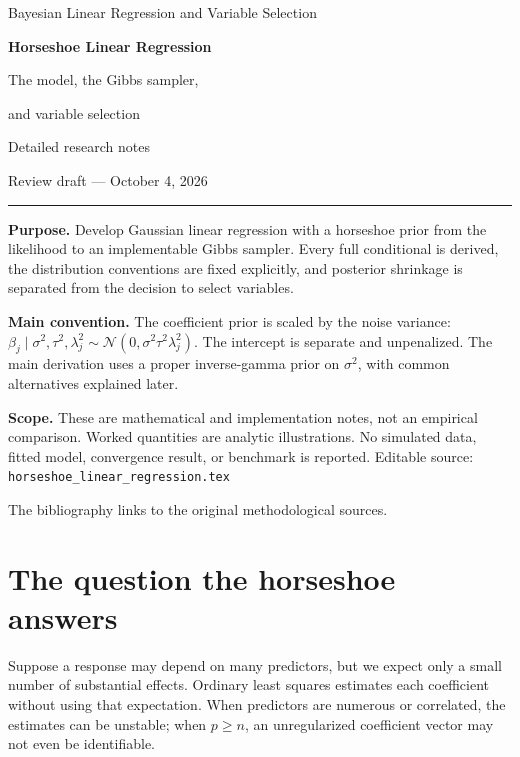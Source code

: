 \documentclass[11pt,letterpaper]{article}
\numberwithin{equation}{section}
\newcommand{\Normal}{\mathcal{N}}
\newcommand{\given}{\mid}
\begin{document}
\hypersetup{pageanchor=false}
\begin{titlepage}
\vspace*{0.65in}
{\color{ink}\Large Bayesian Linear Regression and Variable Selection\par}
\vspace{0.45in}
{\color{ink}\Huge\bfseries Horseshoe Linear Regression\par}
\vspace{0.16in}
{\color{ink}\LARGE The model, the Gibbs sampler,\par and variable selection\par}
\vspace{0.55in}
{\large Detailed research notes\par}
{\large Review draft --- October 4, 2026\par}
\vspace{0.6in}
\hrule
\vspace{0.2in}
\textbf{Purpose.} Develop Gaussian linear regression with a horseshoe prior from
the likelihood to an implementable Gibbs sampler. Every full conditional is
derived, the distribution conventions are fixed explicitly, and posterior
shrinkage is separated from the decision to select variables.

\textbf{Main convention.} The coefficient prior is scaled by the noise variance:
\(\beta_j\given\sigma^2,\tau^2,\lambda_j^2\sim
\Normal(0,\sigma^2\tau^2\lambda_j^2)\). The intercept is separate and unpenalized.
The main derivation uses a proper inverse-gamma prior on \(\sigma^2\), with
common alternatives explained later.

\textbf{Scope.} These are mathematical and implementation notes, not an empirical
comparison. Worked quantities are analytic illustrations. No simulated data,
fitted model, convergence result, or benchmark is reported.
\vfill
\small Editable source: \texttt{horseshoe\_linear\_regression.tex}\par
The bibliography links to the original methodological sources.
\end{titlepage}
\hypersetup{pageanchor=true}
\begingroup
\small
\setlength{\parskip}{0pt}
\tableofcontents
\endgroup
\clearpage
{}

\section{The question the horseshoe answers}

Suppose a response may depend on many predictors, but we expect only a small
number of substantial effects. Ordinary least squares estimates each coefficient
without using that expectation. When predictors are numerous or correlated,
the estimates can be unstable; when \(p\geq n\), an unregularized coefficient
vector may not even be identifiable.
\end{document}
